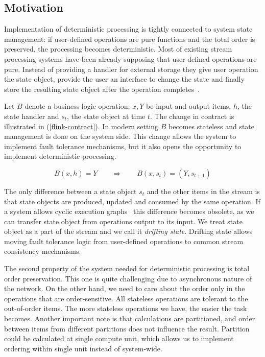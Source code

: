 
\subsection {Motivation}
\label{motivation-section}

Implementation of deterministic processing is tightly connected to system state management: if user-defined operations are pure functions and the total order is preserved, the processing becomes deterministic. Most of existing stream processing systems have been already supposing that user-defined operations are pure. Instead of providing a handler for external storage they give user operation the state object, provide the user an interface to change the state and finally store the resulting state object after the operation completes~\cite{carbone2015apache, apache:storm, Noghabi:2017:SSS:3137765.3137770}.

Let $B$ denote a business logic operation, $x, Y$ be input and output items, $h$, the state handler and $s_t$, the state object at time $t$. The change in contract is illustrated in (\ref{flink-contract}). In modern setting $B$ becomes stateless and state management is done on the system side. This change allows the system to implement fault tolerance mechanisms, but it also opens the opportunity to implement deterministic processing.

\begin{equation}
  \label{flink-contract}
  B(x, h) = Y \qquad\Longrightarrow\qquad B(x, s_{t}) = (Y, s_{t+1}) 
\end{equation}

The only difference between a state object $s_t$ and the other items in the stream is that state objects are produced, updated and consumed by the same operation. If a system allows cyclic execution graphs~\cite{Murray:2013:NTD:2517349.2522738} this difference becomes obsolete, as we can transfer state object from operations output to its input. We treat state object as a part of the stream and we call it {\it drifting state}. Drifting state allows moving fault tolerance logic from user-defined operations to common stream consistency mechanisms.

The second property of the system needed for deterministic processing is total order preservation. This one is quite challenging due to asynchronous nature of the network. On the other hand, we need to care about the order only in the operations that are order-sensitive. All stateless operations are tolerant to the out-of-order items. The more stateless operations we have, the easier the task becomes. Another important note is that calculations are partitioned, and order between items from different partitions does not influence the result. Partition could be calculated at single compute unit, which allows us to implement ordering within single unit instead of system-wide.

